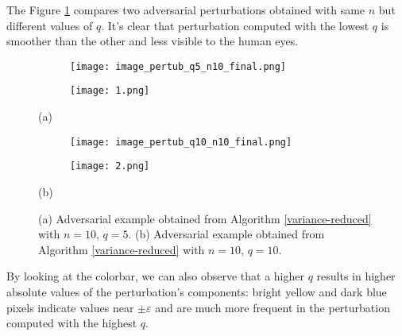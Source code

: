 The Figure \ref{fig:vred} compares two adversarial perturbations obtained with same $n$ but different values of $q$. It's clear that perturbation computed with the lowest $q$ is smoother than the other and less visible to the human eyes.\\

\begin{figure}[h]
	\begin{subfigure}[b]{0.15\textwidth}
		\texttt{[image: image\_pertub\_q5\_n10\_final.png]}
	\end{subfigure}
	\hspace{2.5cm}
	\begin{subfigure}[b]{0.15\textwidth}
		\texttt{[image: 1.png]}
	\end{subfigure}
	\newline
	\centerline{(a)}
	\begin{subfigure}[b]{0.15\textwidth}
		\texttt{[image: image\_pertub\_q10\_n10\_final.png]}
	\end{subfigure}
	\hspace{2.5cm}
	\begin{subfigure}[b]{0.15\textwidth}
		\texttt{[image: 2.png]}
	\end{subfigure}
	\newline
	\centerline{(b)}
	\caption{{\small (a) Adversarial example obtained from Algorithm \ref{variance-reduced} with $n=10$, $q=5$. (b) Adversarial example obtained from Algorithm \ref{variance-reduced} with $n=10$, $q=10$.}  }
	\label{fig:vred}
\end{figure}

By looking at the colorbar, we can also observe that a higher $q$ results in higher absolute values of the perturbation's components: bright yellow and dark blue pixels indicate values near $\pm\varepsilon$ and are much more frequent in the perturbation computed with the highest $q$.


